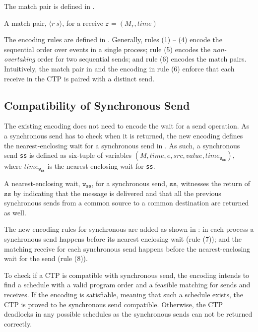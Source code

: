 The match pair is defined in .
\begin{definition}
A match pair, $\langle r\ s\rangle$, for a receive $\mathtt{r}=(M_\mathtt{r},\mathit{time})$
\label{def:mp}
\end{definition}

The encoding rules are defined in \figref{}. Generally, rules (1) -- (4) encode the sequential order over events in a single process; rule (5) encodes the \emph{non-overtaking} order for two sequential sends; and rule (6) encodes the match pairs. Intuitively, the match pair in  and the encoding in rule (6) enforce that each receive in the CTP is paired with a distinct send. 

\encodingptp

\subsection{Compatibility of Synchronous Send}

The existing encoding does not need to encode the wait for a send operation. As a synchronous send has to check when it is returned, the new encoding defines the nearest-enclosing wait for a synchronous send in . As such, a synchronous send \texttt{ss} is defined as six-tuple of variables $(M,\mathit{time},e,\mathit{src},\mathit{value},\mathit{time}_\mathtt{w_{ss}})$, where $\mathit{time}_\mathtt{w_{ss}}$ is the nearest-enclosing wait for \texttt{ss}.

\begin{definition}
A nearest-enclosing wait, $\mathtt{w}_\mathtt{ss}$, for a synchronous send, $\mathtt{ss}$, witnesses the return of $\mathtt{ss}$ by indicating that the message is delivered and that all the previous synchronous sends from a common source to a common destination are returned as well.
\end{definition}

The new encoding rules for synchronous are added as shown in : in each process a synchronous send happens before its nearest enclosing wait (rule (7)); and the matching receive for each synchronous send happens before the nearest-enclosing wait for the send (rule (8)).

\encodingsync

To check if a CTP is compatible with synchronous send, the encoding intends to find a schedule with a valid program order and a feasible matching for sends and receives. If the encoding is satisfiable, meaning that such a schedule exists, the CTP is proved to be synchronous send compatible. Otherwise, the CTP deadlocks in any possible schedules as the synchronous sends can not be returned correctly.


